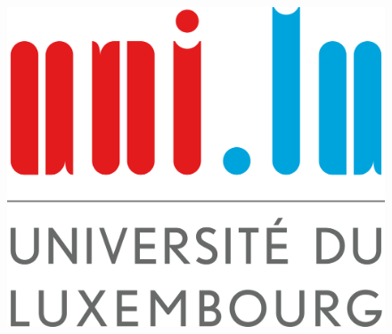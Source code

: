 \documentclass[12pt,a4paper]{book}
\begin{document}

\thispagestyle{empty}

\begin{figure}
\vspace{-1.5cm}
\includegraphics[width=0.15\columnwidth]{logo/University_of_Luxembourg_logo_(fr).png}
\centering
\end{figure}
\end{document}
